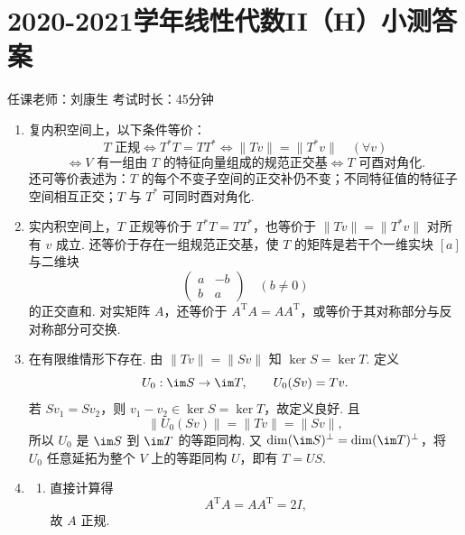 \section{2020-2021学年线性代数II（H）小测答案}

\begin{center}
    任课老师：刘康生\hspace{4em} 考试时长：45分钟
\end{center}
\begin{enumerate}
    \item 复内积空间上，以下条件等价：
    \[
        T\text{ 正规}\iff T^*T=TT^*
        \iff \|Tv\|=\|T^*v\|\quad(\forall v)
    \]
    \[
        \iff V\text{ 有一组由 }T\text{ 的特征向量组成的规范正交基}
        \iff T\text{ 可酉对角化}.
    \]
    还可等价表述为：$T$ 的每个不变子空间的正交补仍不变；不同特征值的特征子空间相互正交；$T$ 与 $T^*$ 可同时酉对角化.

    \item 实内积空间上，$T$ 正规等价于 $T^*T=TT^*$，也等价于 $\|Tv\|=\|T^*v\|$ 对所有 $v$ 成立. 还等价于存在一组规范正交基，使 $T$ 的矩阵是若干个一维实块 $[a]$ 与二维块
    \[
        \begin{pmatrix}a&-b\\ b&a\end{pmatrix}\quad(b\neq 0)
    \]
    的正交直和. 对实矩阵 $A$，还等价于 $A^{\mathrm{T}}A=AA^{\mathrm{T}}$，或等价于其对称部分与反对称部分可交换.

    \item 在有限维情形下存在. 由 $\|Tv\|=\|Sv\|$ 知 $\ker S=\ker T$. 定义
    \[
        U_0:\im S\to \im T,\qquad U_0(Sv)=Tv.
    \]
    若 $Sv_1=Sv_2$，则 $v_1-v_2\in\ker S=\ker T$，故定义良好. 且
    \[
        \|U_0(Sv)\|=\|Tv\|=\|Sv\|,
    \]
    所以 $U_0$ 是 $\im S$ 到 $\im T$ 的等距同构. 又 $\dim(\im S)^\perp=\dim(\im T)^\perp$，将 $U_0$ 任意延拓为整个 $V$ 上的等距同构 $U$，即有 $T=US$.

    \item
    \begin{enumerate}
        \item 直接计算得
        \[
            A^{\mathrm{T}}A=AA^{\mathrm{T}}=2I,
        \]
        故 $A$ 正规.


\end{enumerate}
\end{enumerate}
